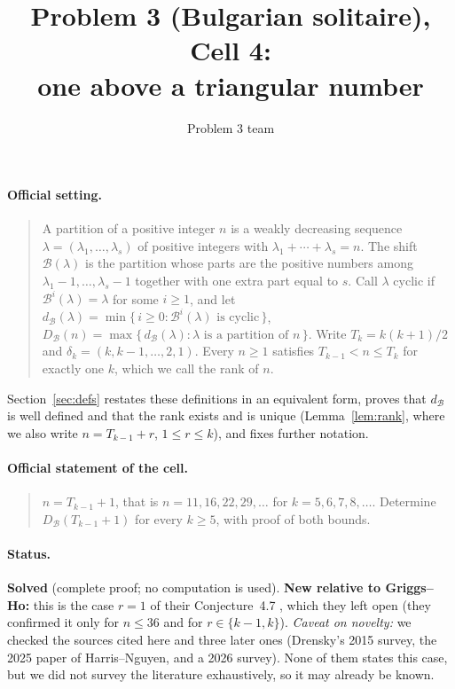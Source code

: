 \documentclass[11pt]{article}
\author{Problem 3 team}
\title{Problem 3 (Bulgarian solitaire), Cell 4:\\ one above a triangular number}
\date{}
\theoremstyle{definition}
\newcommand{\B}{\mathcal{B}}
\newcommand{\dB}{d_{\mathcal{B}}}
\newcommand{\DB}{D_{\mathcal{B}}}
\renewcommand{\le}{\leqslant}
\renewcommand{\ge}{\geqslant}
\begin{document}
\maketitle

\paragraph{Official setting.}
\begin{quote}
A partition of a positive integer $n$ is a weakly decreasing sequence $\lambda=(\lambda_1,\dots,\lambda_s)$ of
positive integers with $\lambda_1+\cdots+\lambda_s=n$.  The shift $\B(\lambda)$ is the partition whose parts are the
positive numbers among $\lambda_1-1,\dots,\lambda_s-1$ together with one extra part equal to $s$.  Call $\lambda$
cyclic if $\B^i(\lambda)=\lambda$ for some $i\ge1$, and let $\dB(\lambda)=\min\{\,i\ge0:\B^i(\lambda)\text{ is cyclic}\,\}$,
$\DB(n)=\max\{\,\dB(\lambda):\lambda\text{ is a partition of }n\,\}$.  Write $T_k=k(k+1)/2$ and
$\delta_k=(k,k-1,\dots,2,1)$.  Every $n\ge1$ satisfies $T_{k-1}<n\le T_k$ for exactly one $k$, which we call the
rank of $n$.
\end{quote}
Section~\ref{sec:defs} restates these definitions in an equivalent form, proves that $\dB$ is well defined and
that the rank exists and is unique (Lemma~\ref{lem:rank}, where we also write $n=T_{k-1}+r$, $1\le r\le k$), and
fixes further notation.

\paragraph{Official statement of the cell.}
\begin{quote}
$n=T_{k-1}+1$, that is $n=11,16,22,29,\dots$ for $k=5,6,7,8,\dots$.  Determine $\DB(T_{k-1}+1)$ for every $k\ge5$,
with proof of both bounds.
\end{quote}

\paragraph{Status.} \textbf{Solved} (complete proof; no computation is used).  \textbf{New relative to Griggs--Ho:} this is the case
$r=1$ of their Conjecture~4.7 \cite{GH}, which they left open (they confirmed it only for $n\le36$ and for
$r\in\{k-1,k\}$).  \emph{Caveat on novelty:} we checked the sources cited here and three later ones (Drensky's
2015 survey, the 2025 paper of Harris--Nguyen, and a 2026 survey).  None of them states this case, but we did not
survey the literature exhaustively, so it may already be known.
\end{document}
